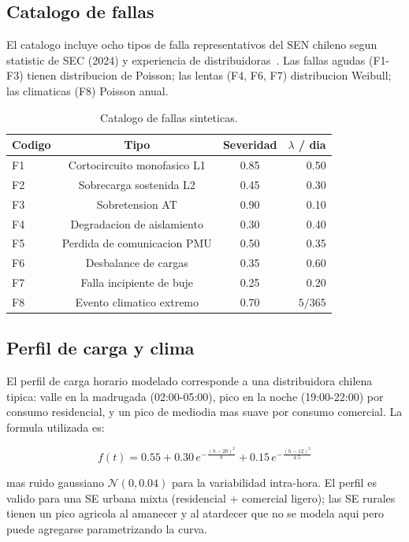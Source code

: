 \subsection{Catalogo de fallas}

El catalogo incluye ocho tipos de falla representativos del SEN
chileno segun statistic de SEC (2024) y experiencia de
distribuidoras~\citep{SEC-Estadisticas-2024}. Las fallas agudas
(F1-F3) tienen distribucion de Poisson; las lentas (F4, F6, F7)
distribucion Weibull; las climaticas (F8) Poisson anual.

\begin{table}[ht]
\centering
\small
\caption{Catalogo de fallas sinteticas.}
\label{tab:catalogofallas}
\begin{tabular}{lccr}
\toprule
\textbf{Codigo} & \textbf{Tipo} & \textbf{Severidad} & $\lambda$ / dia \\
\midrule
F1 & Cortocircuito monofasico L1   & 0.85 & 0.50 \\
F2 & Sobrecarga sostenida L2       & 0.45 & 0.30 \\
F3 & Sobretension AT               & 0.90 & 0.10 \\
F4 & Degradacion de aislamiento    & 0.30 & 0.40 \\
F5 & Perdida de comunicacion PMU   & 0.50 & 0.35 \\
F6 & Desbalance de cargas          & 0.35 & 0.60 \\
F7 & Falla incipiente de buje      & 0.25 & 0.20 \\
F8 & Evento climatico extremo      & 0.70 & $5/365$ \\
\bottomrule
\end{tabular}
\end{table}

\subsection{Perfil de carga y clima}

El perfil de carga horario modelado corresponde a una distribuidora
chilena tipica: valle en la madrugada (02:00-05:00), pico en la noche
(19:00-22:00) por consumo residencial, y un pico de mediodia mas
suave por consumo comercial. La formula utilizada es:

\[
f(t) = 0.55 + 0.30\, e^{-\frac{(h - 20)^2}{8}} + 0.15\, e^{-\frac{(h - 12)^2}{4.5}}
\]

mas ruido gaussiano $\mathcal{N}(0, 0.04)$ para la variabilidad
intra-hora. El perfil es valido para una SE urbana mixta
(residencial + comercial ligero); las SE rurales tienen un pico
agricola al amanecer y al atardecer que no se modela aqui pero
puede agregarse parametrizando la curva.

